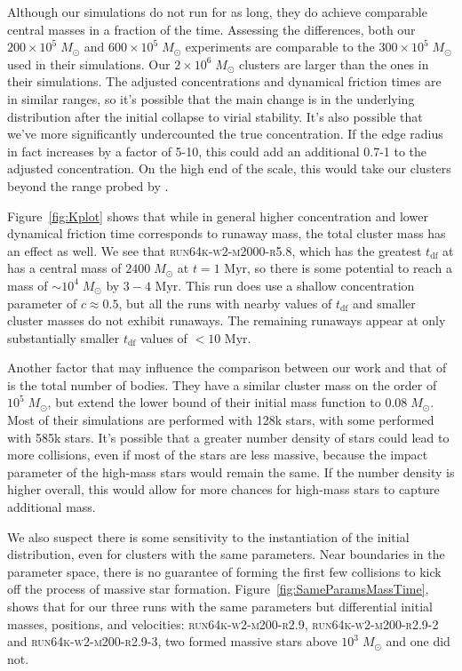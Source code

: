 \documentclass{princeton_astro_thesis}
\newcommand\Msun{\; M_\odot}
\newcommand\msun{\; M_\odot}
\newcommand\Myr{\mbox{ Myr}}
\numberwithin{equation}{section}
\begin{document}
Although our simulations do not run for as long, they do achieve comparable central masses in a fraction of the time.  Assessing the differences, both our $200 \times 10^5 \msun $ and $600 \times 10^5 \msun$ experiments are comparable to the $300 \times 10^5 \msun$ used in their simulations. Our $2 \times 10^6 \msun$ clusters are larger than the ones in their simulations.  The adjusted concentrations and dynamical friction times are in similar ranges, so it's possible that the main change is in the underlying distribution after the initial collapse to virial stability.  It's also possible that we've more significantly undercounted the true concentration. If the edge radius in fact increases by a factor of 5-10, this could add an additional 0.7-1 to the adjusted concentration.  On the high end of the scale, this would take our clusters beyond the range probed by \citet{2004SPZ}.

Figure~\ref{fig:Kplot} shows that while in general higher concentration and lower dynamical friction time corresponds to runaway mass, the total cluster mass has an effect as well. We see that \textsc{run64k-w2-m2000-r5.8}, which has the greatest $t_{\mathrm{df}}$ at  has a central mass of $2400 \Msun$ at $t = 1 \Myr$, so there is some potential to reach a mass of $\sim 10^4 \Msun$ by $3-4 \Myr$.  This run does use a shallow concentration parameter of $c \approx 0.5$, but all the runs with nearby values of $t_{\mathrm{df}}$ and smaller cluster masses do not exhibit runaways.  The remaining runaways appear at only substantially smaller $t_{\mathrm{df}}$ values of $< 10 \Myr$.

Another factor that may influence the comparison between our work and that of \citet{2004SPZ} is the total number of bodies. They have a similar cluster mass on the order of $10^{5} \Msun$, but extend the lower bound of their initial mass function to $0.08 \Msun$.  Most of their simulations are performed with 128k stars, with some performed with 585k stars.  It's possible that a greater number density of stars could lead to more collisions, even if most of the stars are less massive, because the impact parameter of the high-mass stars would remain the same. If the number density is higher overall, this would allow for more chances for high-mass stars to capture additional mass.

We also suspect there is some sensitivity to the instantiation of the initial distribution, even for clusters with the same parameters. Near boundaries in the parameter space, there is no guarantee of forming the first few collisions to kick off the process of massive star formation. Figure~\ref{fig:SameParamsMassTime}, shows that for our three runs with the same parameters but differential initial masses, positions, and velocities: \textsc{run64k-w2-m200-r2.9, run64k-w2-m200-r2.9-2} and \textsc{run64k-w2-m200-r2.9-3}, two formed massive stars above $10^3 \Msun$ and one did not.
\end{document}
